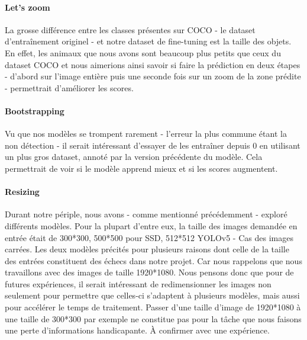 \paragraph{Let's zoom} La grosse différence entre les classes présentes sur COCO - le dataset d'entraînement originel - et notre dataset de fine-tuning est la taille des objets. En effet, les animaux que nous avons sont beaucoup plus petits que ceux du dataset COCO et nous aimerions ainsi savoir si faire la prédiction en deux étapes - d'abord sur l'image entière puis une seconde fois sur un zoom de la zone prédite - permettrait d'améliorer les scores.

\paragraph{Bootstrapping} Vu que nos modèles se trompent rarement - l'erreur la plus commune étant la non détection - il serait intéressant d'essayer de les entraîner depuis $0$ en utilisant un plus gros dataset, annoté par la version précédente du modèle. Cela permettrait de voir si le modèle apprend mieux et si les scores augmentent.

\paragraph{Resizing} Durant notre périple, nous avons - comme mentionné précédemment - exploré différents modèles. Pour la plupart d'entre eux, la taille des images demandée en entrée était de 300*300, 500*500 pour SSD, 512*512 YOLOv5 - Cas des images carrées. Les deux modèles précités pour plusieurs raisons dont celle de la taille des entrées constituent des échecs dans notre projet. Car nous rappelons que nous travaillons avec des images de taille 1920*1080. Nous pensons donc que pour de futures expériences, il serait intéressant de redimensionner les images non seulement pour permettre que celles-ci s'adaptent à plusieurs modèles, mais aussi pour accélérer le temps de traitement. Passer d'une taille d'image de 1920*1080 à une taille de 300*300 par exemple ne constitue pas pour la tâche que nous faisons une perte d'informations handicapante. À confirmer avec une expérience. 
